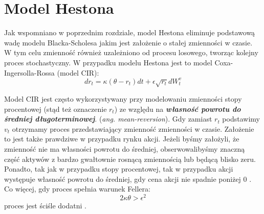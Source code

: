 \documentclass{pracamgr}
\begin{document}




\section{Model Hestona}
Jak wspomniano w poprzednim rozdziale, model Hestona eliminuje podstawową wadę modelu Blacka-Scholesa jakim jest założenie o stałej zmienności w czasie.
W tym celu zmienność również uzależniono od procesu losowego, tworząc kolejny proces stochastyczny. W przypadku modelu Hestona jest to model Coxa-Ingersolla-Rossa (model CIR):
\begin{equation}
dr_t  = \kappa (\theta  - r_t)dt + \epsilon \sqrt{r_t} dW_t^v 
\end{equation}

Model CIR jest często wykorzystywany przy modelowaniu zmienności stopy procentowej (stąd też oznaczenie $r_t$) ze względu na \textbf{\textit{własność powrotu do średniej długoterminowej}}. 
(\textit{ang. mean-reversion}). Gdy zamiast $r_t$ podstawimy $v_t$ otrzymamy proces przedstawiający zmienność zmienności w czasie. Założenie to jest także prawdziwe w przypadku rynku 
akcji. Jeżeli byśmy założyli, że zmienność nie ma własności powrotu do średniej, obserwowalibyśmy znaczną część aktywów z bardzo gwałtownie rosnącą zmiennością lub będącą blisko zeru.
Ponadto, tak jak w przypadku stopy procentowej, tak w przypadku akcji występuje własność powrotu do średniej, gdy cena akcji nie spadnie poniżej 0 \cite{TestingMeanReversion}.
Co więcej, gdy proces spełnia warunek Fellera:
\begin{equation}
2 \kappa \theta > \epsilon^2
\end{equation}
proces jest ściśle dodatni \cite{TheLittleHestonTrap}.
\end{document}
